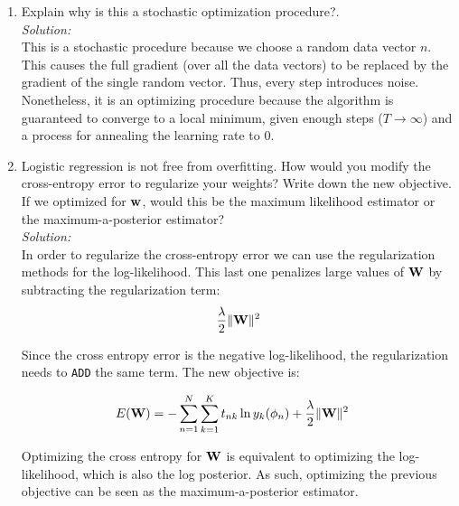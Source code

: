 \documentclass[12pt,a4paper]{article}
\newcommand{\norm}[1]{\|#1\|}
\newcommand{\wscalar}{w}
\newcommand{\wvec}{{\bf \wscalar}}
\newcommand{\Wmat}{{\bf \MakeUppercase\wscalar}}
\begin{document}
\begin{enumerate}
		\item Explain why is this a stochastic optimization procedure?. \\
		\emph{Solution:} \\
		This is a stochastic procedure because we choose a random data vector $n$. This causes the full gradient (over all the data vectors) to be replaced by the gradient of the single random vector. Thus, every step introduces noise. \\
		Nonetheless, it is an optimizing procedure because the algorithm is guaranteed to converge to a local minimum, given enough steps ($T \to \infty $) and a process for annealing the learning rate to $0$.
		
		\item Logistic regression is not free from overfitting. How would you modify the cross-entropy error to regularize your weights? Write down the new objective. If we optimized for $\wvec$, would this be the maximum likelihood estimator or the maximum-a-posterior estimator? \\
		\emph{Solution:} \\
		In order to regularize the cross-entropy error we can use the regularization methods for the log-likelihood. This last one penalizes large values of $\Wmat$ by subtracting the regularization term:
		\begin{align*}
		\frac{\lambda}{2} \norm{\Wmat}^2
		\end{align*}
		
		Since the cross entropy error is the negative log-likelihood, the regularization needs to \texttt{ADD} the same term. The new objective is: 
		
		\begin{align*}
		E(\textbf{W}) &= - \sum_{n=1}^{N}\sum_{k=1}^{K} t_{nk} \ln y_k(\phi_n) + \frac{\lambda}{2} \norm{\Wmat}^2 
		\end{align*}
		
		Optimizing the cross entropy for $\Wmat$ is equivalent to optimizing the log-likelihood, which is also the log posterior. As such, optimizing the previous objective can be seen as the maximum-a-posterior estimator. 
		
	\end{enumerate}
	
\end{document}
